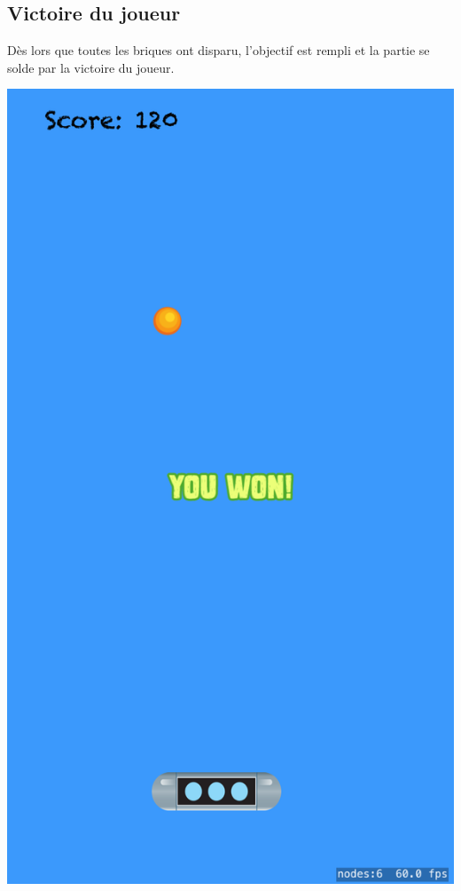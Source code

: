 \documentclass[a4paper]{article}
\begin{document}
\subsection{Victoire du joueur}
Dès lors que toutes les briques ont disparu, l'objectif est rempli et la partie se solde par la victoire du joueur.
\begin{center}
  \includegraphics[scale=0.11]{images/iOS4.png}
\end{center}
\end{document}
